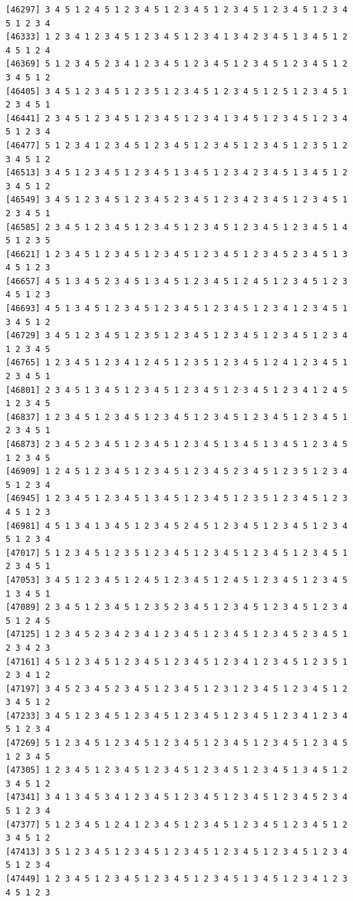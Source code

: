 \documentclass[
  english,
]{book}
\begin{document}
\begin{verbatim}
[46297] 3 4 5 1 2 4 5 1 2 3 4 5 1 2 3 4 5 1 2 3 4 5 1 2 3 4 5 1 2 3 4 5 1 2 3 4
[46333] 1 2 3 4 1 2 3 4 5 1 2 3 4 5 1 2 3 4 1 3 4 2 3 4 5 1 3 4 5 1 2 4 5 1 2 4
[46369] 5 1 2 3 4 5 2 3 4 1 2 3 4 5 1 2 3 4 5 1 2 3 4 5 1 2 3 4 5 1 2 3 4 5 1 2
[46405] 3 4 5 1 2 3 4 5 1 2 3 5 1 2 3 4 5 1 2 3 4 5 1 2 5 1 2 3 4 5 1 2 3 4 5 1
[46441] 2 3 4 5 1 2 3 4 5 1 2 3 4 5 1 2 3 4 1 3 4 5 1 2 3 4 5 1 2 3 4 5 1 2 3 4
[46477] 5 1 2 3 4 1 2 3 4 5 1 2 3 4 5 1 2 3 4 5 1 2 3 4 5 1 2 3 5 1 2 3 4 5 1 2
[46513] 3 4 5 1 2 3 4 5 1 2 3 4 5 1 3 4 5 1 2 3 4 2 3 4 5 1 3 4 5 1 2 3 4 5 1 2
[46549] 3 4 5 1 2 3 4 5 1 2 3 4 5 2 3 4 5 1 2 3 4 2 3 4 5 1 2 3 4 5 1 2 3 4 5 1
[46585] 2 3 4 5 1 2 3 4 5 1 2 3 4 5 1 2 3 4 5 1 2 3 4 5 1 2 3 4 5 1 4 5 1 2 3 5
[46621] 1 2 3 4 5 1 2 3 4 5 1 2 3 4 5 1 2 3 4 5 1 2 3 4 5 2 3 4 5 1 3 4 5 1 2 3
[46657] 4 5 1 3 4 5 2 3 4 5 1 3 4 5 1 2 3 4 5 1 2 4 5 1 2 3 4 5 1 2 3 4 5 1 2 3
[46693] 4 5 1 3 4 5 1 2 3 4 5 1 2 3 4 5 1 2 3 4 5 1 2 3 4 1 2 3 4 5 1 3 4 5 1 2
[46729] 3 4 5 1 2 3 4 5 1 2 3 5 1 2 3 4 5 1 2 3 4 5 1 2 3 4 5 1 2 3 4 1 2 3 4 5
[46765] 1 2 3 4 5 1 2 3 4 1 2 4 5 1 2 3 5 1 2 3 4 5 1 2 4 1 2 3 4 5 1 2 3 4 5 1
[46801] 2 3 4 5 1 3 4 5 1 2 3 4 5 1 2 3 4 5 1 2 3 4 5 1 2 3 4 1 2 4 5 1 2 3 4 5
[46837] 1 2 3 4 5 1 2 3 4 5 1 2 3 4 5 1 2 3 4 5 1 2 3 4 5 1 2 3 4 5 1 2 3 4 5 1
[46873] 2 3 4 5 2 3 4 5 1 2 3 4 5 1 2 3 4 5 1 3 4 5 1 3 4 5 1 2 3 4 5 1 2 3 4 5
[46909] 1 2 4 5 1 2 3 4 5 1 2 3 4 5 1 2 3 4 5 2 3 4 5 1 2 3 5 1 2 3 4 5 1 2 3 4
[46945] 1 2 3 4 5 1 2 3 4 5 1 3 4 5 1 2 3 4 5 1 2 3 5 1 2 3 4 5 1 2 3 4 5 1 2 3
[46981] 4 5 1 3 4 1 3 4 5 1 2 3 4 5 2 4 5 1 2 3 4 5 1 2 3 4 5 1 2 3 4 5 1 2 3 4
[47017] 5 1 2 3 4 5 1 2 3 5 1 2 3 4 5 1 2 3 4 5 1 2 3 4 5 1 2 3 4 5 1 2 3 4 5 1
[47053] 3 4 5 1 2 3 4 5 1 2 4 5 1 2 3 4 5 1 2 4 5 1 2 3 4 5 1 2 3 4 5 1 3 4 5 1
[47089] 2 3 4 5 1 2 3 4 5 1 2 3 5 2 3 4 5 1 2 3 4 5 1 2 3 4 5 1 2 3 4 5 1 2 4 5
[47125] 1 2 3 4 5 2 3 4 2 3 4 1 2 3 4 5 1 2 3 4 5 1 2 3 4 5 2 3 4 5 1 2 3 4 2 3
[47161] 4 5 1 2 3 4 5 1 2 3 4 5 1 2 3 4 5 1 2 3 4 1 2 3 4 5 1 2 3 5 1 2 3 4 1 2
[47197] 3 4 5 2 3 4 5 2 3 4 5 1 2 3 4 5 1 2 3 1 2 3 4 5 1 2 3 4 5 1 2 3 4 5 1 2
[47233] 3 4 5 1 2 3 4 5 1 2 3 4 5 1 2 3 4 5 1 2 3 4 5 1 2 3 4 1 2 3 4 5 1 2 3 4
[47269] 5 1 2 3 4 5 1 2 3 4 5 1 2 3 4 5 1 2 3 4 5 1 2 3 4 5 1 2 3 4 5 1 2 3 4 5
[47305] 1 2 3 4 5 1 2 3 4 5 1 2 3 4 5 1 2 3 4 5 1 2 3 4 5 1 3 4 5 1 2 3 4 5 1 2
[47341] 3 4 1 3 4 5 3 4 1 2 3 4 5 1 2 3 4 5 1 2 3 4 5 1 2 3 4 5 2 3 4 5 1 2 3 4
[47377] 5 1 2 3 4 5 1 2 4 1 2 3 4 5 1 2 3 4 5 1 2 3 4 5 1 2 3 4 5 1 2 3 4 5 1 2
[47413] 3 5 1 2 3 4 5 1 2 3 4 5 1 2 3 4 5 1 2 3 4 5 1 2 3 4 5 1 2 3 4 5 1 2 3 4
[47449] 1 2 3 4 5 1 2 3 4 5 1 2 3 4 5 1 2 3 4 5 1 3 4 5 1 2 3 4 1 2 3 4 5 1 2 3

\end{verbatim}
\end{document}
